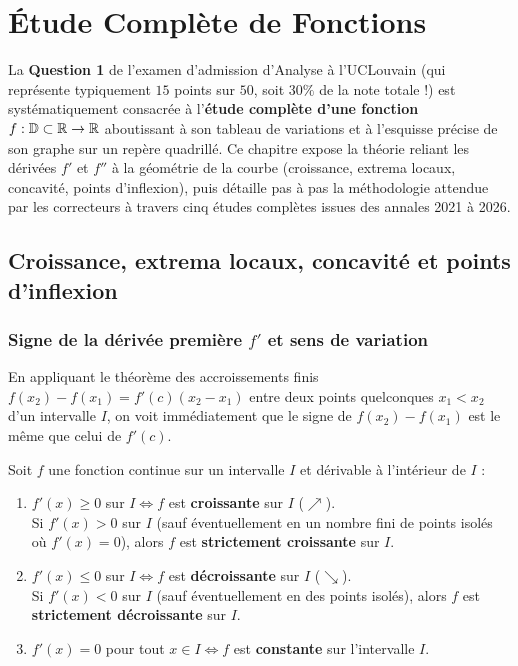 \chapter{Étude Complète de Fonctions}

La \textbf{Question 1} de l'examen d'admission d'Analyse à l'UCLouvain (qui représente typiquement $15$ points sur $50$, soit $30\%$ de la note totale !) est systématiquement consacrée à l'\textbf{étude complète d'une fonction} $f : \mathbb{D} \subset \mathbb{R} \to \mathbb{R}$ aboutissant à son tableau de variations et à l'esquisse précise de son graphe sur un repère quadrillé. Ce chapitre expose la théorie reliant les dérivées $f'$ et $f''$ à la géométrie de la courbe (croissance, extrema locaux, concavité, points d'inflexion), puis détaille pas à pas la méthodologie attendue par les correcteurs à travers cinq études complètes issues des annales 2021 à 2026.

\section{Croissance, extrema locaux, concavité et points d'inflexion}

\subsection{Signe de la dérivée première $f'$ et sens de variation}

En appliquant le théorème des accroissements finis $f(x_2) - f(x_1) = f'(c)(x_2 - x_1)$ entre deux points quelconques $x_1 < x_2$ d'un intervalle $I$, on voit immédiatement que le signe de $f(x_2) - f(x_1)$ est le même que celui de $f'(c)$.

\begin{theoreme}
Soit $f$ une fonction continue sur un intervalle $I$ et dérivable à l'intérieur de $I$ :
\begin{enumerate}
    \item $f'(x) \ge 0$ sur $I \iff f$ est \textbf{croissante} sur $I$ ($\nearrow$).\\
    Si $f'(x) > 0$ sur $I$ (sauf éventuellement en un nombre fini de points isolés où $f'(x) = 0$), alors $f$ est \textbf{strictement croissante} sur $I$.
    \item $f'(x) \le 0$ sur $I \iff f$ est \textbf{décroissante} sur $I$ ($\searrow$).\\
    Si $f'(x) < 0$ sur $I$ (sauf éventuellement en des points isolés), alors $f$ est \textbf{strictement décroissante} sur $I$.
    \item $f'(x) = 0$ pour tout $x \in I \iff f$ est \textbf{constante} sur l'intervalle $I$.
\end{enumerate}
\end{theoreme}

